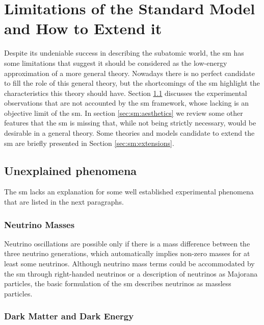 \section{Limitations of the Standard Model and How to Extend it}
\label{sec:smsusy:bsm}

Despite its undeniable success in describing the subatomic world, the \gls{sm} has some limitations that suggest it should be considered as the low-energy approximation of a more general theory. Nowadays there is no perfect candidate to fill the role of this general theory, but the shortcomings of the \gls{sm} highlight the characteristics this theory should have. Section \ref{sec:sm:missingpieces} discusses the experimental observations that are not accounted by the \gls{sm} framework, whose lacking is an objective limit of the \gls{sm}. In section \ref{sec:sm:aesthetics} we review some other features that the \gls{sm} is missing that, while not being strictly necessary, would be desirable in a general theory. Some theories and models candidate to extend the \gls{sm} are briefly presented in Section \ref{sec:sm:extensions}.

\subsection{Unexplained phenomena}
\label{sec:sm:missingpieces}

The \gls{sm} lacks an explanation for some well established experimental phenomena that are listed in the next paragraphs.

\subsubsection*{Neutrino Masses}

Neutrino oscillations \cite{PhysRevLett.81.1562} are possible only if there is a mass difference between the three neutrino generations, which automatically implies non-zero masses for at least some neutrinos. Although neutrino mass terms could be accommodated by the \gls{sm} through right-handed neutrinos or a description of neutrinos as Majorana particles, the basic formulation of the \gls{sm} describes neutrinos as massless particles.

\subsubsection*{Dark Matter and Dark Energy}

